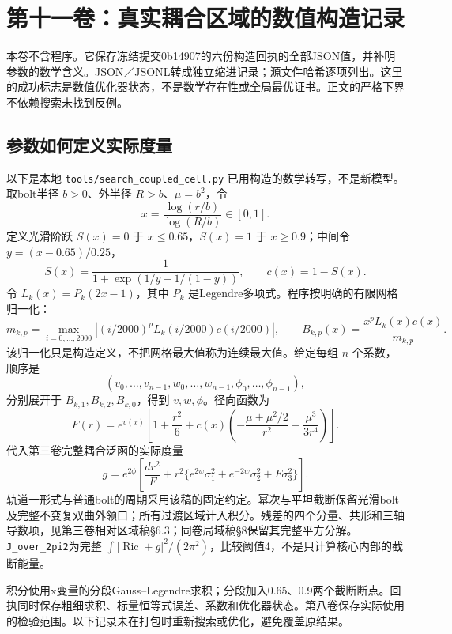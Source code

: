 \documentclass[
  10pt,
]{article}
\author{}
\date{}
\begin{document}
\hypertarget{ux7b2cux5341ux4e00ux5377ux771fux5b9eux8026ux5408ux533aux57dfux7684ux6570ux503cux6784ux9020ux8bb0ux5f55}{%
\section{第十一卷：真实耦合区域的数值构造记录}\label{ux7b2cux5341ux4e00ux5377ux771fux5b9eux8026ux5408ux533aux57dfux7684ux6570ux503cux6784ux9020ux8bb0ux5f55}}

本卷不含程序。它保存冻结提交0b14907的六份构造回执的全部JSON值，并补明参数的数学含义。JSON／JSONL转成独立缩进记录；源文件哈希逐项列出。这里的成功标志是数值优化器状态，不是数学存在性或全局最优证书。正文的严格下界不依赖搜索未找到反例。

\hypertarget{ux53c2ux6570ux5982ux4f55ux5b9aux4e49ux5b9eux9645ux5ea6ux91cf}{%
\subsection{参数如何定义实际度量}\label{ux53c2ux6570ux5982ux4f55ux5b9aux4e49ux5b9eux9645ux5ea6ux91cf}}

以下是本地 \nolinkurl{tools/search_coupled_cell.py}
已用构造的数学转写，不是新模型。取bolt半径 \(b>0\)、外半径
\(R>b\)、\(\mu=b^2\)，令 \[
x=\frac{\log(r/b)}{\log(R/b)}\in[0,1].
\] 定义光滑阶跃 \(S(x)=0\) 于 \(x\le0.65\)，\(S(x)=1\) 于
\(x\ge0.9\)；中间令 \(y=(x-0.65)/0.25\)， \[
S(x)=\frac{1}{1+\exp(1/y-1/(1-y))},\qquad c(x)=1-S(x).
\] 令 \(L_k(x)=P_k(2x-1)\)，其中 \(P_k\)
是Legendre多项式。程序按明确的有限网格归一化： \[
m_{k,p}=\max_{i=0,\ldots,2000}
\left|(i/2000)^p L_k(i/2000)c(i/2000)\right|,
\qquad B_{k,p}(x)=\frac{x^pL_k(x)c(x)}{m_{k,p}}.
\] 该归一化只是构造定义，不把网格最大值称为连续最大值。给定每组 \(n\)
个系数，顺序是 \[
(v_0,\ldots,v_{n-1},w_0,\ldots,w_{n-1},\phi_0,\ldots,\phi_{n-1}),
\] 分别展开于 \(B_{k,1},B_{k,2},B_{k,0}\)，得到 \(v,w,\phi\)。径向函数为
\[
F(r)=e^{v(x)}\left[1+\frac{r^2}{6}
+c(x)\left(-\frac{\mu+\mu^2/2}{r^2}
+\frac{\mu^3}{3r^4}\right)\right].
\] 代入第三卷完整耦合泛函的实际度量 \[
g=e^{2\phi}\left[\frac{dr^2}{F}
+r^2\{e^{2w}\sigma_1^2+e^{-2w}\sigma_2^2+F\sigma_3^2\}\right].
\]
轨道一形式与普通bolt的周期采用该稿的固定约定。幂次与平坦截断保留光滑bolt及完整不变复双曲外领口；所有过渡区域计入积分。残差的四个分量、共形和三轴导数项，见第三卷相对区域稿§6.3；同卷局域稿§8保留其完整平方分解。\nolinkurl{J_over_2pi2}为完整
\(\int|\operatorname{Ric}+g|^2/(2\pi^2)\)，比较阈值4，不是只计算核心内部的截断能量。

积分使用x变量的分段Gauss--Legendre求积；分段加入0.65、0.9两个截断断点。回执同时保存粗细求积、标量恒等式误差、系数和优化器状态。第八卷保存实际使用的检验范围。以下记录未在打包时重新搜索或优化，避免覆盖原结果。
\end{document}
